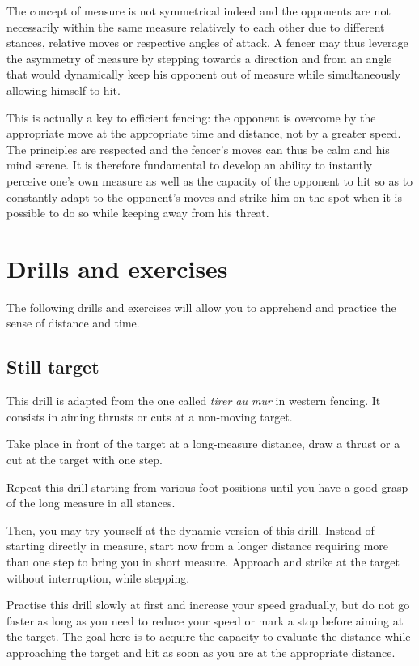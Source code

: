 The concept of measure is not symmetrical indeed and the opponents are not necessarily within the same measure relatively to each other due to different stances, relative moves or respective angles of attack. 
A fencer may thus leverage the asymmetry of measure by stepping towards a direction and from an angle that would dynamically keep his opponent out of measure while simultaneously allowing himself to hit.
\FloatBarrier

This is actually a key to efficient \Taiji{} fencing: the opponent is overcome by the appropriate move at the appropriate time and distance, not by a greater speed.
The principles are respected and the fencer's moves can thus be calm and his mind serene.
It is therefore fundamental to develop an ability to instantly perceive one's own measure as well as the capacity of the opponent to hit so as to constantly adapt to the opponent's moves and strike him on the spot when it is possible to do so while keeping away from his threat.

\section{Drills and exercises}
The following drills and exercises will allow you to apprehend and practice the sense of distance and time.

\subsection{Still target}
This drill is adapted from the one called \emph{tirer au mur} in western fencing.
It consists in aiming thrusts or cuts at a non-moving target.

Take place in front of the target at a long-measure distance, draw a thrust or a cut at the target with one step. 

Repeat this drill starting from various foot positions until you have a good grasp of the long measure in all stances.

Then, you may try yourself at the dynamic version of this drill.
Instead of starting directly in measure, start now from a longer distance requiring more than one step to bring you in short measure.
Approach and strike at the target without interruption, while stepping.

Practise this drill slowly at first and increase your speed gradually, but do not go faster as long as you need to reduce your speed or mark a stop before aiming at the target.
The goal here is to acquire the capacity to evaluate the distance while approaching the target and hit as soon as you are at the appropriate distance.

